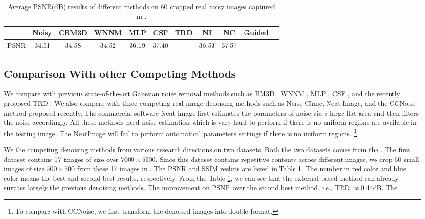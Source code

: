 \documentclass[10pt,twocolumn,letterpaper]{article}
\begin{document}
\begin{table}\label{tab1}
\caption{Average PSNR(dB) results of different methods on 60 cropped real noisy images captured in \cite{crosschannel2016}.}
\label{tab1}
\begin{center}
\renewcommand\arraystretch{1}
\begin{tabular}{|c||c|c|c|c|c|c|c|c|c|c|}
\hline
 & \textbf{Noisy} &\textbf{CBM3D}&\textbf{WNNM}&\textbf{MLP}&\textbf{CSF}&\textbf{TRD}& \textbf{NI}& \textbf{NC} &\textbf{Guided} 
\\
\hline
PSNR & 34.51 & 34.58 & 34.52 & 36.19 & 37.40 & {\color{blue}{37.75}} & 36.53 & 37.57  & {\color{red}{ 38.75}}
\\
\hline
\end{tabular}
\end{center}
\end{table}

\subsection{Comparison With other Competing Methods}
We compare with previous state-of-the-art Gaussian noise removal methods such as BM3D \cite{bm3d}, WNNM \cite{wnnm}, MLP \cite{mlp}, CSF \cite{csf}, and the recently proposed TRD \cite{chen2015learning}. We also compare with three competing real image denoising methods such as Noise Clinic, Neat Image, and the CCNoise method proposed recently.  The commercial software Neat Image \cite{neatimage} first estimates the parameters of noise via a large flat area and then filters the noise accordingly. All these methods need noise estimation which is vary hard to perform if there is no uniform regions are available in the testing image. The NeatImage will fail to perform automatical parameters settings if there is no uniform regions. \footnote{To compare with CCNoise, we first transform the denoised images into double format.}

We the competing denoising methods from various research directions on two datasets. Both the two datasets comes from the \cite{crosschannel2016}. The first dataset contains 17 images of size over $7000\times5000$. Since this dataset contains repetitive contents across different images, we crop 60 small images of size $500\times500$ from these 17 images in \cite{crosschannel2016}. The PSNR and SSIM resluts are listed in Table \ref{tab1}. The number in red color and blue color means the best and second best results, respectively. From the Table \ref{tab1}, we can see that the external based method can already surpass largely the previous denoising methods. The improvement on PSNR over the second best method, i.e., TRD, is 0.44dB. The 
\end{document}
